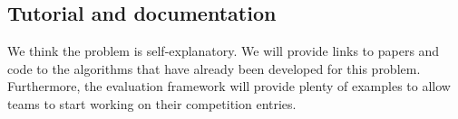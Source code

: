 

\subsection{Tutorial and documentation}

We think the problem is self-explanatory. We will provide links to
papers and code to the algorithms that have already been developed for this
problem. Furthermore, the evaluation framework will provide plenty 
of examples to allow teams to start working on their competition entries.



